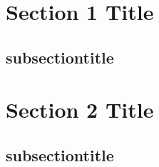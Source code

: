 \section{Section 1 Title}
\subsection{subsectiontitle}


\section{Section 2 Title}
\subsection{subsectiontitle}
